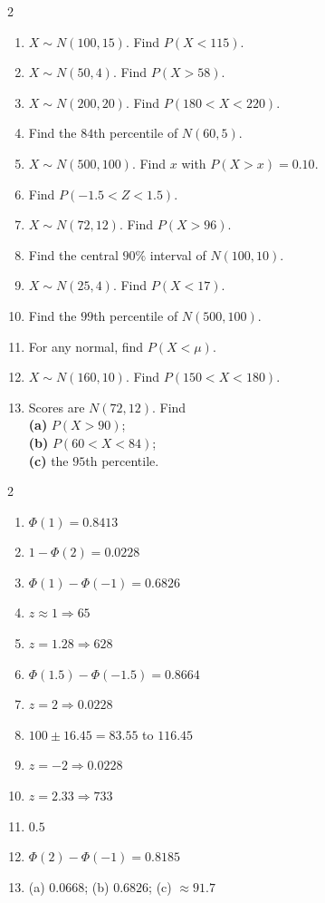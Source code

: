 \documentclass[11pt]{article}
\begin{document}
\begin{recapbox}
\begin{multicols}{2}
\small
\begin{enumerate}[leftmargin=*,itemsep=3pt]
  \item $X\sim N(100,15)$. Find $P(X<115)$.
  \item $X\sim N(50,4)$. Find $P(X>58)$.
  \item $X\sim N(200,20)$. Find $P(180<X<220)$.
  \item Find the $84$th percentile of $N(60,5)$.
  \item $X\sim N(500,100)$. Find $x$ with $P(X>x)=0.10$.
  \item Find $P(-1.5<Z<1.5)$.
  \item $X\sim N(72,12)$. Find $P(X>96)$.
  \item Find the central $90\%$ interval of $N(100,10)$.
  \item $X\sim N(25,4)$. Find $P(X<17)$.
  \item Find the $99$th percentile of $N(500,100)$.
  \item For any normal, find $P(X<\mu)$.
  \item $X\sim N(160,10)$. Find $P(150<X<180)$.
  \item Scores are $N(72,12)$. Find \\ \textbf{(a)} $P(X>90)$; \\ \textbf{(b)} $P(60<X<84)$; \\ \textbf{(c)} the $95$th percentile.
\end{enumerate}
\end{multicols}
\end{recapbox}

\begin{keybox}
\begin{multicols}{2}
\small
\begin{enumerate}[leftmargin=*,itemsep=3pt]
  \item $\Phi(1)=0.8413$
  \item $1-\Phi(2)=0.0228$
  \item $\Phi(1)-\Phi(-1)=0.6826$
  \item $z\approx1\Rightarrow65$
  \item $z=1.28\Rightarrow628$
  \item $\Phi(1.5)-\Phi(-1.5)=0.8664$
  \item $z=2\Rightarrow0.0228$
  \item $100\pm16.45=83.55$ to $116.45$
  \item $z=-2\Rightarrow0.0228$
  \item $z=2.33\Rightarrow733$
  \item $0.5$
  \item $\Phi(2)-\Phi(-1)=0.8185$
  \item (a) $0.0668$; (b) $0.6826$; (c) $\approx91.7$
\end{enumerate}
\end{multicols}
\end{keybox}
\end{document}
